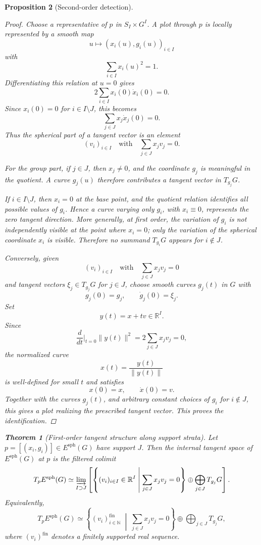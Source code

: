 \documentclass[11pt]{amsart}
\newtheorem{theorem}{Theorem}[section]
\newtheorem{proposition}[theorem]{Proposition}
\begin{document}
\begin{proposition}[Second-order detection]
\begin{proof}
Choose a representative of \(p\) in \(S_I\times G^I\). A plot through \(p\) is locally represented by a smooth map
\[
u\longmapsto (x_i(u),g_i(u))_{i\in I}
\]
with
\[
\sum_{i\in I}x_i(u)^2=1.
\]
Differentiating this relation at \(u=0\) gives
\[
2\sum_{i\in I}x_i(0)\dot x_i(0)=0.
\]
Since \(x_i(0)=0\) for \(i\in I\setminus J\), this becomes
\[
\sum_{j\in J}x_j\dot x_j(0)=0.
\]
Thus the spherical part of a tangent vector is an element
\[
(v_i)_{i\in I}
\quad\text{with}\quad
\sum_{j\in J}x_jv_j=0.
\]

For the group part, if \(j\in J\), then \(x_j\neq0\), and the coordinate \(g_j\) is meaningful in the quotient. A curve \(g_j(u)\) therefore contributes a tangent vector in \(T_{g_j}G\).

If \(i\in I\setminus J\), then \(x_i=0\) at the base point, and the quotient relation identifies all possible values of \(g_i\). Hence a curve varying only \(g_i\), with \(x_i\equiv0\), represents the zero tangent direction. More generally, at first order, the variation of \(g_i\) is not independently visible at the point where \(x_i=0\); only the variation of the spherical coordinate \(x_i\) is visible. Therefore no summand \(T_{g_i}G\) appears for \(i\notin J\).

Conversely, given
\[
(v_i)_{i\in I}
\quad\text{with}\quad
\sum_{j\in J}x_jv_j=0
\]
and tangent vectors \(\xi_j\in T_{g_j}G\) for \(j\in J\), choose smooth curves \(g_j(t)\) in \(G\) with
\[
g_j(0)=g_j,\qquad \dot g_j(0)=\xi_j.
\]
Set
\[
y(t)=x+tv\in \mathbb R^I.
\]
Since
\[
\frac{d}{dt}\bigg|_{t=0}\|y(t)\|^2
=
2\sum_{j\in J}x_jv_j=0,
\]
the normalized curve
\[
x(t)=\frac{y(t)}{\|y(t)\|}
\]
is well-defined for small \(t\) and satisfies
\[
x(0)=x,\qquad \dot x(0)=v.
\]
Together with the curves \(g_j(t)\), and arbitrary constant choices of \(g_i\) for \(i\notin J\), this gives a plot realizing the prescribed tangent vector. This proves the identification.
\end{proof}

\begin{theorem}[First-order tangent structure along support strata]
Let \(p=[(x_i,g_i)]\in E^{\mathrm{sph}}(G)\) have support \(J\). Then the internal tangent space of \(E^{\mathrm{sph}}(G)\) at \(p\) is the filtered colimit
\[
T_pE^{\mathrm{sph}}(G)
\simeq
\varinjlim_{I\supset J}
\left[
\left\{
(v_i)_{i\in I}\in \mathbb R^I
\;\middle|\;
\sum_{j\in J}x_jv_j=0
\right\}
\oplus
\bigoplus_{j\in J}T_{g_j}G
\right].
\]
Equivalently,
\[
T_pE^{\mathrm{sph}}(G)
\simeq
\left\{
(v_i)_{i\in\mathbb N}^{\mathrm{fin}}
\;\middle|\;
\sum_{j\in J}x_jv_j=0
\right\}
\oplus
\bigoplus_{j\in J}T_{g_j}G,
\]
where \((v_i)^{\mathrm{fin}}\) denotes a finitely supported real sequence.
\end{theorem}


\end{proposition}
\end{document}
